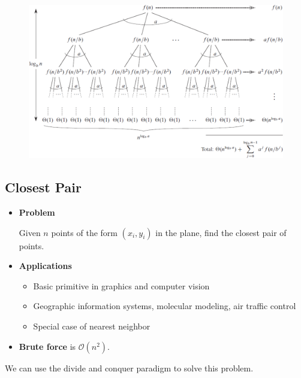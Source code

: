 \begin{figure}[ht!]
    \centering

    \includegraphics[width=\linewidth]{figures/master-theorem.png}
\end{figure}

\subsection{Closest Pair}

\begin{itemize}
    \item \textbf{Problem}
    
    Given $n$ points of the form $(x_i, y_i)$ in the plane, find the closest pair of points.

    \item \textbf{Applications}
    
    \begin{itemize}
        \item Basic primitive in graphics and computer vision
        \item Geographic information systems, molecular modeling, air traffic control
        \item Special case of nearest neighbor
    \end{itemize}

    \item \textbf{Brute force} is $\mathcal{O}(n^2)$.
\end{itemize}

We can use the divide and conquer paradigm to solve this problem.

